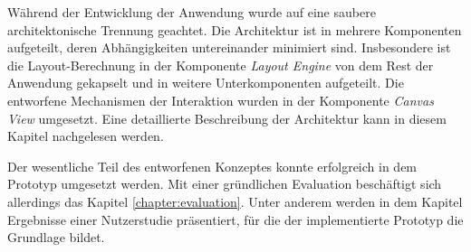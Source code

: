 Während der Entwicklung der Anwendung wurde auf eine saubere architektonische Trennung geachtet. Die Architektur ist in mehrere Komponenten aufgeteilt, deren Abhängigkeiten untereinander minimiert sind. Insbesondere ist die Layout-Berechnung in der Komponente \textit{Layout Engine} von dem Rest der Anwendung gekapselt und in weitere Unterkomponenten aufgeteilt. Die entworfene Mechanismen der Interaktion wurden in der Komponente \textit{Canvas View} umgesetzt. Eine detaillierte Beschreibung der Architektur kann in diesem Kapitel nachgelesen werden.

Der wesentliche Teil des entworfenen Konzeptes konnte erfolgreich in dem Prototyp umgesetzt werden. Mit einer gründlichen Evaluation beschäftigt sich allerdings das Kapitel \ref{chapter:evaluation}. Unter anderem werden in dem Kapitel Ergebnisse einer Nutzerstudie präsentiert, für die der implementierte Prototyp die Grundlage bildet.
